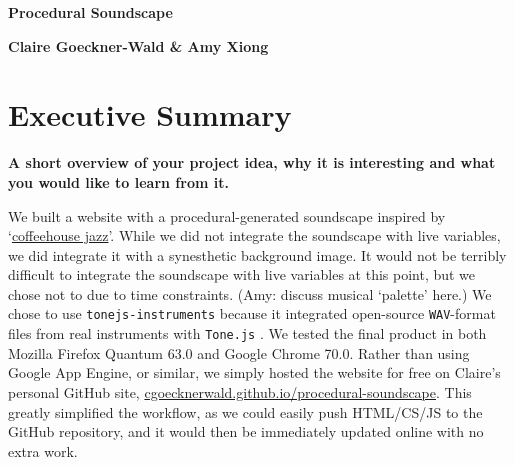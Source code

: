 \documentclass[12pt,a4paper]{article}
\newcommand{\code}{\texttt}
\newcommand{\lightcode}[1]{\colorbox{light-gray}{\texttt{#1}}}
\begin{document}
\pagestyle{plain}


\begin{center}
{\LARGE{\bf
{{Procedural Soundscape}}
}}
\end{center}
\bigskip

\centerline{\bf{Claire Goeckner-Wald \& Amy Xiong}}

\bigskip

\tableofcontents

\pagebreak
\section{Executive Summary}

\textbf{A short overview of your project idea, why it is interesting and what you would like to learn from it.}

We built a website with a procedural-generated soundscape inspired by `\href{https://www.youtube.com/watch?v=K2Q6YO3Ez44}{coffeehouse jazz}'. While we did not integrate the soundscape with live variables, we did integrate it with a synesthetic background image. It would not be terribly difficult to integrate the soundscape with live variables at this point, but we chose not to due to time constraints. (Amy: discuss musical `palette' here.) We chose to use \lightcode{tonejs-instruments} because it integrated open-source \code{WAV}-format files from real instruments with \lightcode{Tone.js} \cite{tonejs-instruments}. We tested the final product in both Mozilla Firefox Quantum 63.0 and Google Chrome 70.0. Rather than using Google App Engine, or similar, we simply hosted the website for free on Claire's personal GitHub site, \href{https://cgoecknerwald.github.io/procedural-soundscape}{cgoecknerwald.github.io/procedural-soundscape}. This greatly simplified the workflow, as we could easily push HTML/CS/JS to the GitHub repository, and it would then be immediately updated online with no extra work.
\end{document}
